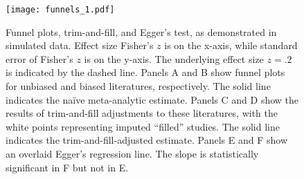 \documentclass[man, mask]{apa6}
\begin{document}



\newpage



\begin{figure}
	\texttt{[image: funnels\_1.pdf]}
	\caption{Funnel plots, trim-and-fill, and Egger's test, as demonstrated in simulated data. Effect size Fisher's $z$ is on the x-axis, while standard error of Fisher's $z$ is on the y-axis. The underlying effect size $z = .2$ is indicated by the dashed line. Panels A and B show funnel plots for unbiased and biased literatures, respectively. The solid line indicates the na{\"i}ve meta-analytic estimate. Panels C and D show the results of trim-and-fill adjustments to these literatures, with the white points representing imputed ``filled'' studies. The solid line indicates the trim-and-fill-adjusted estimate. Panels E and F show an overlaid Egger's regression line. The slope is statistically significant in F but not in E.}
	\label{funnels1}
\end{figure}
\end{document}
